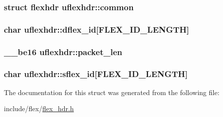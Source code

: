 \subsubsection[{\texorpdfstring{common}{common}}]{\setlength{\rightskip}{0pt plus 5cm}struct {\bf flexhdr} uflexhdr\+::common}\hypertarget{structuflexhdr_a298ecaecd1223467c1820a652458cff9}{}\label{structuflexhdr_a298ecaecd1223467c1820a652458cff9}
\subsubsection[{\texorpdfstring{dflex\+\_\+id}{dflex_id}}]{\setlength{\rightskip}{0pt plus 5cm}char uflexhdr\+::dflex\+\_\+id\mbox{[}{\bf F\+L\+E\+X\+\_\+\+I\+D\+\_\+\+L\+E\+N\+G\+TH}\mbox{]}}\hypertarget{structuflexhdr_a8733c5298ef2cdefd132ecec4878605f}{}\label{structuflexhdr_a8733c5298ef2cdefd132ecec4878605f}
\subsubsection[{\texorpdfstring{packet\+\_\+len}{packet_len}}]{\setlength{\rightskip}{0pt plus 5cm}\+\_\+\+\_\+be16 uflexhdr\+::packet\+\_\+len}\hypertarget{structuflexhdr_a633f53e21cbca9248040e940553af36e}{}\label{structuflexhdr_a633f53e21cbca9248040e940553af36e}
\subsubsection[{\texorpdfstring{sflex\+\_\+id}{sflex_id}}]{\setlength{\rightskip}{0pt plus 5cm}char uflexhdr\+::sflex\+\_\+id\mbox{[}{\bf F\+L\+E\+X\+\_\+\+I\+D\+\_\+\+L\+E\+N\+G\+TH}\mbox{]}}\hypertarget{structuflexhdr_a359db5a95d160b5bacdde8883a9d1ee7}{}\label{structuflexhdr_a359db5a95d160b5bacdde8883a9d1ee7}


The documentation for this struct was generated from the following file\+:\begin{DoxyCompactItemize}
\item 
include/flex/\hyperlink{flex__hdr_8h}{flex\+\_\+hdr.\+h}\end{DoxyCompactItemize}

